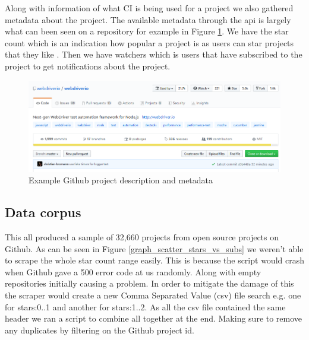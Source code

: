 \documentclass[twoside,12pt,titlepage,a4paper]{article}
\begin{document}
Along with information of what CI is being used for a project we also gathered metadata about the project. The available metadata through the api is largely what can been seen on a repository for example in Figure \ref{ExampleGithubMetaData}. We have the star count which is an indication how popular a project is as users can star projects that they like \citet{Borges2016}. Then we have watchers which is users that have subscribed to the project to get notifications about the project. 

\begin{figure}[h]
  \centering
  \includegraphics[scale=0.5, width=\textwidth]{2020-04-01-11-37-22.png}
  \caption[alt text]{Example Github project description and metadata\cite{GithubMetaDataExample}}
  \label{ExampleGithubMetaData}
\end{figure}

\vspace*{-0.05in}
\subsection{Data corpus}
\label{section:corpus}
\vspace*{-0.05in}
This all produced a sample of 32,660 projects from open source projects on Github. As can be seen in Figure \ref{graph_scatter_stars_vs_subs} we weren't able to scrape the whole star count range easily. This is because the script would crash when Github gave a 500 error code at us randomly. Along with empty repositories initially causing a problem. In order to mitigate the damage of this the scraper would create a new Comma Separated Value (csv) file search e.g. one for stars:0..1 and another for stars:1..2. As all the csv file contained the same header we ran a script to combine all together at the end. Making sure to remove any duplicates by filtering on the Github project id.
\end{document}
